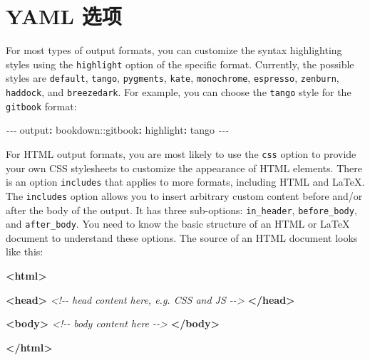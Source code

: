 \documentclass[
  12pt,
]{krantz}
\newenvironment{Shaded}{\begin{snugshade}}{\end{snugshade}}
\newcommand{\AttributeTok}[1]{\textcolor[rgb]{0.77,0.63,0.00}{#1}}
\newcommand{\CommentTok}[1]{\textcolor[rgb]{0.56,0.35,0.01}{\textit{#1}}}
\newcommand{\FunctionTok}[1]{\textcolor[rgb]{0.00,0.00,0.00}{#1}}
\newcommand{\KeywordTok}[1]{\textcolor[rgb]{0.13,0.29,0.53}{\textbf{#1}}}
\newcommand{\PreprocessorTok}[1]{\textcolor[rgb]{0.56,0.35,0.01}{\textit{#1}}}
\theoremstyle{definition}
\theoremstyle{definition}
\theoremstyle{definition}
\theoremstyle{definition}
\theoremstyle{remark}
\begin{document}
\hypertarget{yaml-options}{%
\section{YAML 选项}\label{yaml-options}}

For most types of output formats, you can customize the syntax highlighting styles using the \texttt{highlight} option of the specific format. Currently, the possible styles are \texttt{default}, \texttt{tango}, \texttt{pygments}, \texttt{kate}, \texttt{monochrome}, \texttt{espresso}, \texttt{zenburn}, \texttt{haddock}, and \texttt{breezedark}. For example, you can choose the \texttt{tango} style for the \texttt{gitbook} format:

\begin{Shaded}
\begin{Highlighting}[]
\PreprocessorTok{{-}{-}{-}}
\FunctionTok{output}\KeywordTok{:}
\AttributeTok{  bookdown:}\FunctionTok{:gitbook}\KeywordTok{:}
\AttributeTok{    }\FunctionTok{highlight}\KeywordTok{:}\AttributeTok{ tango}
\PreprocessorTok{{-}{-}{-}}
\end{Highlighting}
\end{Shaded}

For HTML output formats, you are most likely to use the \texttt{css} option to provide your own CSS stylesheets to customize the appearance of HTML elements. There is an option \texttt{includes} that applies to more formats, including HTML and LaTeX. The \texttt{includes} option allows you to insert arbitrary custom content before and/or after the body of the output. It has three sub-options: \texttt{in\_header}, \texttt{before\_body}, and \texttt{after\_body}. You need to know the basic structure of an HTML or LaTeX document to understand these options. The source of an HTML document looks like this:

\begin{Shaded}
\begin{Highlighting}[]
\KeywordTok{\textless{}html\textgreater{}}
  
  \KeywordTok{\textless{}head\textgreater{}}
  \CommentTok{\textless{}!{-}{-} head content here, e.g. CSS and JS {-}{-}\textgreater{}}
  \KeywordTok{\textless{}/head\textgreater{}}
  
  \KeywordTok{\textless{}body\textgreater{}}
  \CommentTok{\textless{}!{-}{-} body content here {-}{-}\textgreater{}}
  \KeywordTok{\textless{}/body\textgreater{}}

\KeywordTok{\textless{}/html\textgreater{}}
\end{Highlighting}
\end{Shaded}
\end{document}
